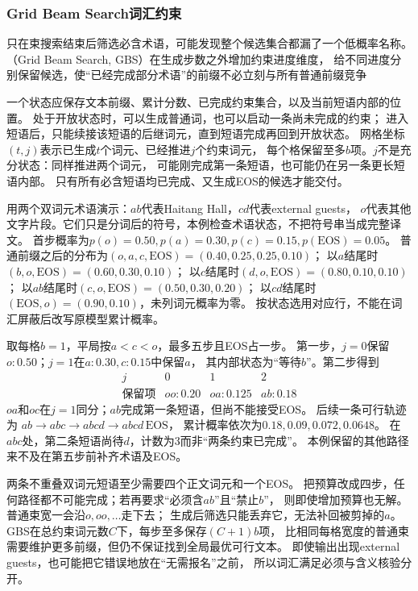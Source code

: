 \subsubsection{Grid Beam Search词汇约束}
\label{sec:nlp-generation-gbs}

只在束搜索结束后筛选必含术语，可能发现整个候选集合都漏了一个低概率名称。
（Grid Beam Search, GBS）在生成步数之外增加约束进度维度，
给不同进度分别保留候选，使“已经完成部分术语”的前缀不必立刻与所有普通前缀竞争

一个状态应保存文本前缀、累计分数、已完成约束集合，以及当前短语内部的位置。
处于开放状态时，可以生成普通词，也可以启动一条尚未完成的约束；
进入短语后，只能续接该短语的后继词元，直到短语完成再回到开放状态。
网格坐标$(t,j)$表示已生成$t$个词元、已经推进$j$个约束词元，
每个格保留至多$b$项。$j$不是充分状态：同样推进两个词元，
可能刚完成第一条短语，也可能仍在另一条更长短语内部。
只有所有必含短语均已完成、又生成EOS的候选才能交付。

用两个双词元术语演示：$ab$代表Haitang Hall，$cd$代表external guests，
$o$代表其他文字片段。它们只是分词后的符号，本例检查术语状态，不把符号串当成完整译文。
首步概率为$p(o)=0.50,p(a)=0.30,p(c)=0.15,p(\mathrm{EOS})=0.05$。
普通前缀之后的分布为$(o,a,c,\mathrm{EOS})=(0.40,0.25,0.25,0.10)$；
以$a$结尾时$(b,o,\mathrm{EOS})=(0.60,0.30,0.10)$；
以$c$结尾时$(d,o,\mathrm{EOS})=(0.80,0.10,0.10)$；
以$ab$结尾时$(c,o,\mathrm{EOS})=(0.50,0.30,0.20)$；
以$cd$结尾时$(\mathrm{EOS},o)=(0.90,0.10)$，未列词元概率为零。
按状态选用对应行，不能在词汇屏蔽后改写原模型累计概率。

取每格$b=1$，平局按$a<c<o$，最多五步且EOS占一步。
第一步，$j=0$保留$o:0.50$；$j=1$在$a:0.30,c:0.15$中保留$a$，
其内部状态为“等待$b$”。第二步得到
\[
  \begin{array}{c|ccc}
    j&0&1&2\\ \hline
    \text{保留项}&oo:0.20&oa:0.125&ab:0.18
  \end{array}
\]
$oa$和$oc$在$j=1$同分；$ab$完成第一条短语，但尚不能接受EOS。
后续一条可行轨迹为
$ab\rightarrow abc\rightarrow abcd\rightarrow abcd\,\mathrm{EOS}$，
累计概率依次为$0.18,0.09,0.072,0.0648$。
在$abc$处，第二条短语尚待$d$，计数为3而非“两条约束已完成”。
本例保留的其他路径来不及在第五步前补齐术语及EOS。

两条不重叠双词元短语至少需要四个正文词元和一个EOS。
把预算改成四步，任何路径都不可能完成；若再要求“必须含$ab$”且“禁止$b$”，
则即使增加预算也无解。普通束宽一会沿$o,oo,\ldots$走下去；
生成后筛选只能丢弃它，无法补回被剪掉的$a$。
GBS在总约束词元数$C$下，每步至多保存$(C+1)b$项，
比相同每格宽度的普通束需要维护更多前缀，但仍不保证找到全局最优可行文本。
即使输出出现external guests，也可能把它错误地放在“无需报名”之前，
所以词汇满足必须与含义核验分开。

